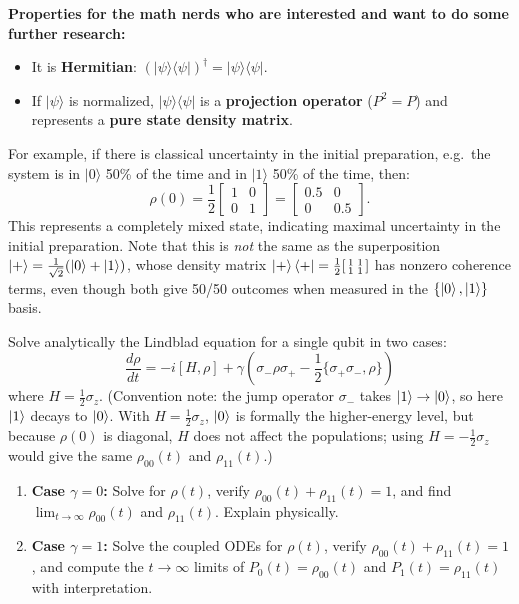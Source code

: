 \documentclass[11pt]{article}
\begin{document}
\textbf{Properties for the math nerds who are interested and want to do some further research:}
\begin{itemize}
    \item It is \textbf{Hermitian}: \( (|\psi\rangle \langle \psi|)^\dagger = |\psi\rangle \langle \psi| \).
    \item If \( |\psi\rangle \) is normalized, \( |\psi\rangle \langle \psi| \) is a \textbf{projection operator} (\(P^2=P\)) and represents a \textbf{pure state density matrix}.

\end{itemize}

For example, if there is classical uncertainty in the initial preparation, e.g.\ the system is in $|0\rangle$ 50\% of the time and in $|1\rangle$ 50\% of the time, then:
\begin{equation*}
    \rho(0) = \frac{1}{2} \begin{bmatrix} 1 & 0 \\ 0 & 1 \end{bmatrix} = \begin{bmatrix} 0.5 & 0 \\ 0 & 0.5 \end{bmatrix}.
\end{equation*}
This represents a completely mixed state, indicating maximal uncertainty in the initial preparation. Note that this is \emph{not} the same as the superposition $\ket{+}=\tfrac{1}{\sqrt2}(\ket0+\ket1)$, whose density matrix $\ket{+}\bra{+}=\tfrac12\begin{bsmallmatrix}1&1\\1&1\end{bsmallmatrix}$ has nonzero coherence terms, even though both give 50/50 outcomes when measured in the $\{\ket0,\ket1\}$ basis.

Solve analytically the Lindblad equation for a single qubit in two cases:
\begin{equation}
    \frac{d\rho}{dt} = -i[H, \rho] + \gamma (\sigma_- \rho \sigma_+ - \frac{1}{2}\{\sigma_+ \sigma_-, \rho\})
\end{equation}
where $H = \frac{1}{2} \sigma_z$. (Convention note: the jump operator $\sigma_-$ takes $\ket1\to\ket0$, so here $\ket1$ decays to $\ket0$. With $H=\tfrac12\sigma_z$, $\ket0$ is formally the higher-energy level, but because $\rho(0)$ is diagonal, $H$ does not affect the populations; using $H=-\tfrac12\sigma_z$ would give the same $\rho_{00}(t)$ and $\rho_{11}(t)$.)
\begin{enumerate}[label=(\alph*)]
  \item \textbf{Case $\gamma=0$:} Solve for $\rho(t)$, verify $\rho_{00}(t)+\rho_{11}(t)=1$, and find $\lim_{t\to\infty}\rho_{00}(t)$ and $\rho_{11}(t)$. Explain physically.
  \item \textbf{Case $\gamma=1$:} Solve the coupled ODEs for $\rho(t)$, verify $\rho_{00}(t)+\rho_{11}(t)=1$, and compute the $t\to\infty$ limits of $P_0(t)=\rho_{00}(t)$ and $P_1(t)=\rho_{11}(t)$ with interpretation. 
\end{enumerate}
\end{document}
